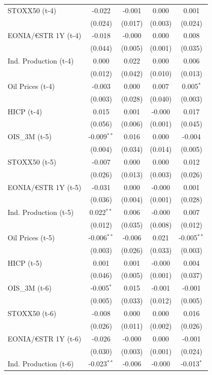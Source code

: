 \begin{longtable}[t]{lcccc}
STOXX50 (t-4) & -0.022 & -0.001 & 0.000 & 0.001\\
 & (0.024) & (0.017) & (0.003) & (0.024)\\
EONIA/€STR 1Y (t-4) & -0.018 & -0.000 & 0.000 & 0.008\\
 & (0.044) & (0.005) & (0.001) & (0.035)\\
Ind. Production (t-4) & 0.000 & 0.022 & 0.000 & 0.006\\
 & (0.012) & (0.042) & (0.010) & (0.013)\\
Oil Prices (t-4) & -0.003 & 0.000 & 0.007 & 0.005$^{*}$\\
 & (0.003) & (0.028) & (0.040) & (0.003)\\
HICP (t-4) & 0.015 & 0.001 & -0.000 & 0.017\\
 & (0.056) & (0.006) & (0.001) & (0.045)\\
OIS\_3M (t-5) & -0.009$^{**}$ & 0.016 & 0.000 & -0.004\\
 & (0.004) & (0.034) & (0.014) & (0.005)\\
STOXX50 (t-5) & -0.007 & 0.000 & 0.000 & 0.012\\
 & (0.026) & (0.013) & (0.003) & (0.026)\\
EONIA/€STR 1Y (t-5) & -0.031 & 0.000 & -0.000 & 0.001\\
 & (0.036) & (0.004) & (0.001) & (0.028)\\
Ind. Production (t-5) & 0.022$^{**}$ & 0.006 & -0.000 & 0.007\\
 & (0.012) & (0.035) & (0.008) & (0.012)\\
Oil Prices (t-5) & -0.006$^{**}$ & -0.006 & 0.021 & -0.005$^{**}$\\
 & (0.003) & (0.026) & (0.033) & (0.003)\\
HICP (t-5) & 0.001 & 0.001 & -0.000 & 0.004\\
 & (0.046) & (0.005) & (0.001) & (0.037)\\
OIS\_3M (t-6) & -0.005$^{*}$ & 0.015 & -0.001 & -0.001\\
 & (0.005) & (0.033) & (0.012) & (0.005)\\
STOXX50 (t-6) & -0.008 & 0.000 & 0.000 & 0.016\\
 & (0.026) & (0.011) & (0.002) & (0.026)\\
EONIA/€STR 1Y (t-6) & -0.026 & -0.000 & 0.000 & -0.001\\
 & (0.030) & (0.003) & (0.001) & (0.024)\\
Ind. Production (t-6) & -0.023$^{**}$ & -0.006 & -0.000 & -0.013$^{*}$\\

\end{longtable}
